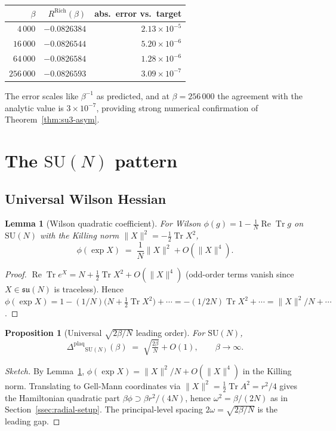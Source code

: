 \documentclass[11pt,a4paper]{article}
\newtheorem{proposition}[theorem]{Proposition}
\newtheorem{lemma}[theorem]{Lemma}
\theoremstyle{definition}
\newcommand{\SU}{\mathrm{SU}}
\newcommand{\Tr}{\operatorname{Tr}}
\renewcommand{\Re}{\operatorname{Re}}
\newcommand{\Gap}{{\Delta^{\mathrm{plaq}}}}
\begin{document}
\begin{center}
\begin{tabular}{rrr}
\toprule
$\beta$ & $R^{\mathrm{Rich}}(\beta)$ & abs.\ error vs.\ target \\
\midrule
$4\,000$ & $-0.0826384$ & $2.13\times 10^{-5}$ \\
$16\,000$ & $-0.0826544$ & $5.20\times 10^{-6}$ \\
$64\,000$ & $-0.0826584$ & $1.28\times 10^{-6}$ \\
$256\,000$ & $-0.0826593$ & $3.09\times 10^{-7}$ \\
\bottomrule
\end{tabular}
\end{center}

The error scales like $\beta^{-1}$ as predicted, and at
$\beta = 256\,000$ the agreement with the analytic value is
$3\times 10^{-7}$, providing strong numerical confirmation of
Theorem~\ref{thm:su3-asym}.

\section{The $\SU(N)$ pattern}\label{sec:sun}

\subsection{Universal Wilson Hessian}

\begin{lemma}[Wilson quadratic coefficient]\label{lem:c2}
For Wilson $\phi(g) = 1 - \tfrac{1}{N}\Re\Tr g$ on $\SU(N)$ with the
Killing norm $\|X\|^2 = -\tfrac{1}{2}\Tr X^2$,
\[
\phi(\exp X) \;=\; \frac{1}{N}\|X\|^2 + O(\|X\|^4).
\]
\end{lemma}

\begin{proof}
$\Re\Tr e^X = N + \tfrac{1}{2}\Tr X^2 + O(\|X\|^4)$ (odd-order terms
vanish since $X\in\mathfrak{su}(N)$ is traceless). Hence
$\phi(\exp X) = 1 - (1/N)\big(N + \tfrac{1}{2}\Tr X^2\big) + \cdots
= -(1/2N)\Tr X^2 + \cdots = \|X\|^2/N + \cdots$.
\end{proof}

\begin{proposition}[Universal $\sqrt{2\beta/N}$ leading order]
\label{prop:sun-pattern}
For $\SU(N)$,
\[
\Gap_{\SU(N)}(\beta) \;=\; \sqrt{\tfrac{2\beta}{N}} + O(1),
\qquad\beta\to\infty.
\]
\end{proposition}

\begin{proof}[Sketch]
By Lemma~\ref{lem:c2}, $\phi(\exp X) = \|X\|^2/N + O(\|X\|^4)$ in the
Killing norm. Translating to Gell-Mann coordinates via
$\|X\|^2 = \tfrac{1}{2}\Tr A^2 = r^2/4$ gives the Hamiltonian
quadratic part $\beta\phi \supset \beta r^2/(4N)$, hence
$\omega^2 = \beta/(2N)$ as in
Section~\ref{ssec:radial-setup}. The principal-level spacing
$2\omega = \sqrt{2\beta/N}$ is the leading gap.
\end{proof}
\end{document}
